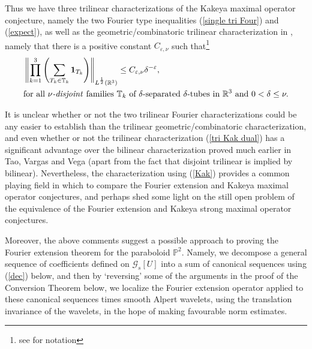 \documentclass{amsart}%
\theoremstyle{plain}
\numberwithin{equation}{section}
\begin{document}
Thus we have three trilinear characterizations of the Kakeya maximal operator
conjecture, namely the two Fourier type inequalities (\ref{single tri Four})
and (\ref{expect}), as well as the geometric/combinatoric trilinear
characterization in \cite{RiSa2}, namely that there is a positive constant
$C_{\varepsilon,\nu}$ such that\footnote{see \cite{RiSa2} for notation}%
\begin{align}
&  \left\Vert \prod_{k=1}^{3}\left(  \sum_{T_{k}\in\mathbb{T}_{k}}%
\mathbf{1}_{T_{k}}\right)  \right\Vert _{L^{\frac{1}{2}}\left(  \mathbb{R}%
^{3}\right)  }\leq C_{\varepsilon,\nu}\delta^{-\varepsilon}%
,\label{tri Kak dual}\\
&  \text{for all }\nu\text{\emph{-disjoint }families }\mathbb{T}_{k}\text{ of
}\delta\text{-separated }\delta\text{-tubes in }\mathbb{R}^{3}\text{ and
}0<\delta\leq\nu.\nonumber
\end{align}


It is unclear whether or not the two trilinear Fourier characterizations could
be any easier to establish than the trilinear geometric/combinatoric
characterization, and even whether or not the trilinear characterization
(\ref{tri Kak dual}) has a significant advantage over the bilinear
characterization proved much earlier in Tao, Vargas and Vega \cite{TaVaVe}
(apart from the fact that disjoint trilinear is implied by bilinear).
Nevertheless, the characterization using (\ref{Kak}) provides a common playing
field in which to compare the Fourier extension and Kakeya maximal operator
conjectures, and perhaps shed some light on the still open problem of the
equivalence of the Fourier extension and Kakeya strong maximal operator conjectures.

Moreover, the above comments suggest a possible approach to proving the
Fourier extension theorem for the paraboloid $\mathbb{P}^{2}$. Namely, we
decompose a general sequence of coefficients defined on $\mathcal{G}%
_{s}\left[  U\right]  $ into a sum of canonical sequences using (\ref{dec})
below, and then by `reversing' some of the arguments in the proof of the
Conversion Theorem below, we localize the Fourier extension operator applied
to these canonical sequences times smooth Alpert wavelets, using the
translation invariance of the wavelets, in the hope of making favourable norm estimates.
\end{document}

